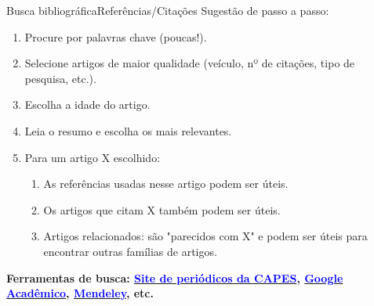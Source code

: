 \documentclass[t]{beamer}
\begin{document}

\begin{ftst}{Busca bibliográfica}{Referências/Citações}
\justifying
Sugestão de passo a passo:
\begin{enumerate}
    \item Procure por palavras chave (poucas!).

    \item Selecione artigos de maior qualidade (veículo, nº de citações, tipo de pesquisa, etc.).

    \item Escolha a idade do artigo.

    \item Leia o resumo e escolha os mais relevantes.
    \item Para um artigo X escolhido:
    \begin{enumerate}
        \item As referências usadas nesse artigo podem ser úteis.
        \item Os artigos que citam X também podem ser úteis.
        \item Artigos relacionados: são "parecidos com X" e podem ser úteis para encontrar outras famílias de artigos.
    \end{enumerate}
\end{enumerate}
\vone
\small
\textbf{Ferramentas de busca: \href{https://www-periodicos-capes-gov-br.ezl.periodicos.capes.gov.br/index.php?}{\textcolor{blue}{Site de periódicos da CAPES}}, \href{https://scholar.google.com.br/?hl=pt}{\textcolor{blue}{Google Acadêmico}}, \href{https://www.mendeley.com/}{\textcolor{blue}{Mendeley}}, etc.}

\end{ftst}
\end{document}
